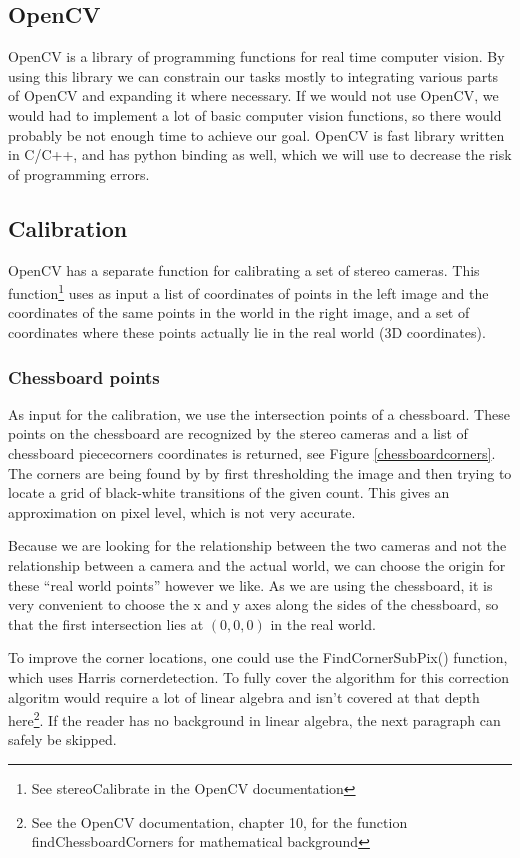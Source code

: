 \documentclass[a4paper]{article}
\begin{document}
\subsection{OpenCV}
\label{opencv} OpenCV is a library of programming functions for real
time computer vision. By using this library we can constrain our tasks
mostly to integrating various parts of OpenCV and expanding it where
necessary. If we would not use OpenCV, we would had to implement a lot
of basic computer vision functions, so there would probably be not
enough time to achieve our goal. OpenCV is fast library written in C/C++,
and has python binding as well, which we will use to decrease the risk
of programming errors.

\subsection{Calibration}
\label{calib_implement} OpenCV has a separate function for calibrating
a set of stereo cameras. This function\footnote{See stereoCalibrate in
the OpenCV documentation} uses as input a list of coordinates of
points in the left image and the coordinates of the same points in the
world in the right image, and a set of coordinates where these points
actually lie in the real world (3D coordinates).

\subsubsection{Chessboard points}
\label{chessboardpoints} As input for the calibration, we use
the intersection points of a chessboard. These points on the
chessboard are recognized by the stereo cameras and a list of
chessboard piececorners coordinates is returned, see Figure
\ref{chessboardcorners}. The corners are being found by by first
thresholding the image and then trying to locate a grid of black-white
transitions of the given count. This gives an approximation on pixel level,
which is not very accurate.

Because we are looking for the relationship between the two cameras and
not the relationship between a camera and the actual world, we can
choose the origin for these ``real world points'' however we like. As
we are using the chessboard, it is very convenient to choose the x and
y axes along the sides of the chessboard, so that the first
intersection lies at $(0, 0, 0)$ in the real world.

To improve the corner locations, one could use the FindCornerSubPix()
function, which uses Harris cornerdetection. To fully cover the
algorithm for this correction algoritm would require a lot of linear
algebra and isn't covered at that depth here\footnote{See the OpenCV
documentation, chapter 10, for the function findChessboardCorners for
mathematical background}. If the reader has no background in linear
algebra, the next paragraph can safely be skipped.
\end{document}
